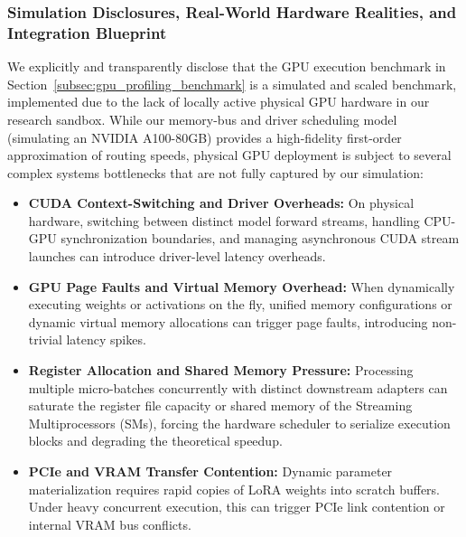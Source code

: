 \subsubsection{Simulation Disclosures, Real-World Hardware Realities, and Integration Blueprint}
We explicitly and transparently disclose that the GPU execution benchmark in Section~\ref{subsec:gpu_profiling_benchmark} is a simulated and scaled benchmark, implemented due to the lack of locally active physical GPU hardware in our research sandbox. While our memory-bus and driver scheduling model (simulating an NVIDIA A100-80GB) provides a high-fidelity first-order approximation of routing speeds, physical GPU deployment is subject to several complex systems bottlenecks that are not fully captured by our simulation:
\begin{itemize}
    \item \textbf{CUDA Context-Switching and Driver Overheads:} On physical hardware, switching between distinct model forward streams, handling CPU-GPU synchronization boundaries, and managing asynchronous CUDA stream launches can introduce driver-level latency overheads.
    \item \textbf{GPU Page Faults and Virtual Memory Overhead:} When dynamically executing weights or activations on the fly, unified memory configurations or dynamic virtual memory allocations can trigger page faults, introducing non-trivial latency spikes.
    \item \textbf{Register Allocation and Shared Memory Pressure:} Processing multiple micro-batches concurrently with distinct downstream adapters can saturate the register file capacity or shared memory of the Streaming Multiprocessors (SMs), forcing the hardware scheduler to serialize execution blocks and degrading the theoretical speedup.
    \item \textbf{PCIe and VRAM Transfer Contention:} Dynamic parameter materialization requires rapid copies of LoRA weights into scratch buffers. Under heavy concurrent execution, this can trigger PCIe link contention or internal VRAM bus conflicts.
\end{itemize}

